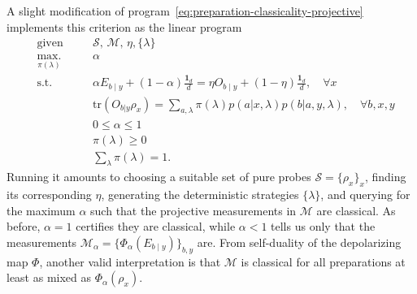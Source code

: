         A slight modification of program~\eqref{eq:preparation-classicality-projective} implements this criterion as the linear program
        \begin{subequations}
            \begin{alignat}{2}
                &\text{given}    &\quad & \mathcal{S},\, \mathcal{M},\, \eta, \{ \lambda \} \\
                &\underset{\pi(\lambda)}{\text{max.}}   &	  & \alpha \\
                &\text{s.t.}    &      & \alpha E_{b \mid y} + (1 - \alpha)\frac{\mathbf{1}_d}{d} = \eta O_{b \mid y} + \left( 1 - \eta \right) \frac{\mathbf{1}_d}{d}, \quad\forall x \\
                &                  &      & \text{tr}(O_{b \vert y} \rho_x) = \sum_{a, \lambda} \pi(\lambda) p(a \vert x, \lambda) p(b \vert a, y, \lambda), \quad\forall b, x, y \\
                &				   &	  & 0 \leq \alpha \leq 1 \\
                &				   &	  & \pi(\lambda) \geq 0 \\
                &				   &	  & \sum_\lambda \pi(\lambda) = 1 .
            \end{alignat}
            \label{eq:measurement-classicality-projective}
        \end{subequations}
        Running it amounts to choosing a suitable set of pure probes $\mathcal{S} = \{ \rho_x \}_x$, finding its corresponding $\eta$, generating the deterministic strategies $\{ \lambda \}$, and querying for the maximum $\alpha$ such that the projective measurements in $\mathcal{M}$ are classical. As before, $\alpha = 1$ certifies they are classical, while $\alpha < 1$ tells us only that the measurements $\mathcal{M}_\alpha = \{ \Phi_\alpha \left( E_{b \mid y} \right) \}_{b,y}$ are. From self-duality of the depolarizing map $\Phi$, another valid interpretation is that $\mathcal{M}$ is classical for all preparations at least as mixed as $\Phi_\alpha \left( \rho_x \right)$.

